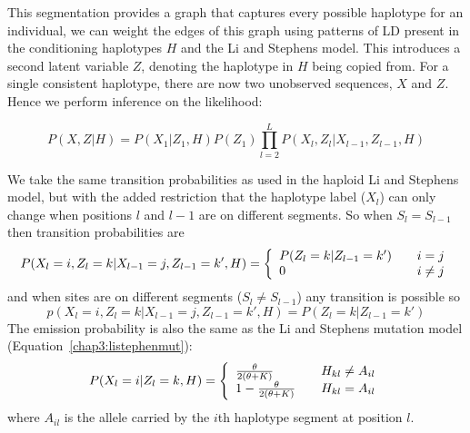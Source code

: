 This segmentation provides a graph that captures every possible haplotype for an individual, we can weight the edges of this graph using patterns of LD present in the conditioning haplotypes $H$ and the Li and Stephens model. This introduces a second latent variable $Z$,  denoting the haplotype in $H$ being copied from. For a single consistent haplotype, there are now two unobserved sequences, $X$ and $Z$.  Hence we perform inference on the likelihood:

$$P(X,Z|H) = P(X_1|Z_1,H) P(Z_1) \prod_{l=2}^L P(X_l,Z_l|X_{l-1},Z_{l-1},H)$$

We take the same transition probabilities as used in the haploid Li and Stephens model, but with the added restriction that the haplotype label ($X_l$) can only change when positions $l$ and $l-1$ are on different segments.  So when $S_l=S_{l-1}$ then transition probabilities are
\[ P(X_l=i,Z_l=k|X_{l-1}=j,Z_{l-1}=k',H) = \left\{ 
  \begin{array}{l l}
    P(Z_l=k|Z_{l-1}=k')  & \quad i=j\\
     0    & \quad  i\neq j\\
  \end{array} \right.\] \label{chap3:listephentrans} 
and when sites are on different segments ($S_l\neq S_{l-1}$) any transition is possible so
$$ p(X_l=i,Z_l=k|X_{l-1}=j,Z_{l-1}=k',H) =  P(Z_l=k|Z_{l-1}=k') $$
The emission probability is also the same as the Li and Stephens mutation model (Equation~\ref{chap3:listephenmut}):
\[ P(X_l=i|Z_l=k,H)  = \left\{ 
  \begin{array}{l l}
    \frac{\theta}{2(\theta+K)}               & \quad H_{kl} \neq A_{il}\\
    1-\frac{\theta}{2(\theta+K)}      & \quad H_{kl} = A_{il}
  \end{array}  
\right.\]
where $A_{il}$ is the allele carried by the $i$th haplotype segment at position $l$.  

